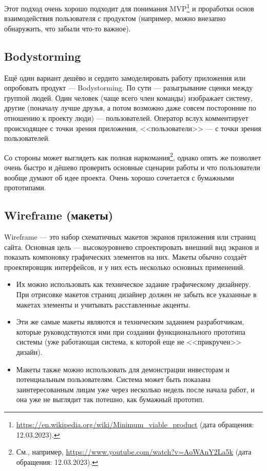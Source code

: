 \documentclass{../../text-style}
\begin{document}
Этот подход очень хорошо подходит для понимания MVP\footnote{\url{https://en.wikipedia.org/wiki/Minimum_viable_product} (дата обращения: 12.03.2023).} и проработки основ взаимодействия пользователя с продуктом (например, можно внезапно обнаружить, что забыли что-то важное).

\subsection{Bodystorming}

Ещё один вариант дешёво и сердито замоделировать работу приложения или опробовать продукт --- Bodystorming. По сути --- разыгрывание сценки между группой людей. Один человек (чаще всего член команды) изображает систему, другие (поначалу лучше друзья, а потом возможно даже совсем посторонние по отношению к проекту люди) --- пользователей. Оператор вслух комментирует происходящее с точки зрения приложения, <<пользователи>> --- с точки зрения пользователей.

Со стороны может выглядеть как полная наркомания\footnote{См., например, \url{https://www.youtube.com/watch?v=AoWAnY2La5k} (дата обращения: 12.03.2023).}, однако опять же позволяет очень быстро и дёшево проверить основные сценарии работы и что пользователи вообще думают об идее проекта. Очень хорошо сочетается с бумажными прототипами.

\subsection{Wireframe (макеты)}

Wireframe --- это набор схематичных макетов экранов приложения или страниц сайта. Основная цель --- высокоуровнево спроектировать внешний вид экранов и показать компоновку графических элементов на них. Макеты обычно создаёт проектировщик интерфейсов, и у них есть несколько основных применений.

\begin{itemize}
    \item Их можно использовать как техническое задание графическому дизайнеру. При отрисовке макетов страниц дизайнер должен не забыть все указанные в макетах элементы и учитывать расставленные акценты.
    \item Эти же самые макеты являются и техническим заданием разработчикам, которые руководствуются ими при создании функционального прототипа системы (уже работающая система, к которой еще не <<прикручен>> дизайн).
    \item Макеты также можно использовать для демонстрации инвесторам и потенциальным пользователям. Система может быть показана заинтересованным лицам уже через несколько недель после начала работ, и она уже не выглядит так потешно, как бумажный прототип.
\end{itemize}
\end{document}
